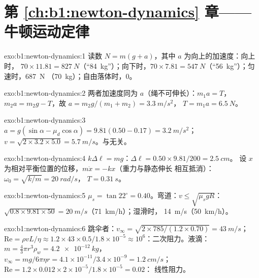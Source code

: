\section*{第 \ref{ch:b1:newton-dynamics} 章——牛顿运动定律}

\begin{solution}{exo:b1:newton-dynamics:1}
读数 $N = m(g + a)$，其中 $a$ 为向上的加速度：向上时，
$70 \times 11.81 = \qty{827}{N}$（``\qty{84}{kg}''）；向下时，$70 \times 7.81 =
\qty{547}{N}$（``\qty{56}{kg}''）；匀速时，\qty{687}{N}
（\qty{70}{kg}）；自由落体时，$0$。
\end{solution}

\begin{solution}{exo:b1:newton-dynamics:2}
两者加速度同为 $a$（绳不可伸长）：$m_1a = T$，
$m_2a = m_2g - T$，故 $a = m_2g/(m_1 + m_2) = \qty{3.3}{m/s^2}$，
$T = m_1a = \qty{6.5}{N}$。
\end{solution}

\begin{solution}{exo:b1:newton-dynamics:3}
$a = g(\sin\alpha - \mu_d\cos\alpha) = 9.81(0.50 - 0.17) = \qty{3.2}{m/s^2}$；
$v = \sqrt{2 \times 3.2 \times 5.0} = \qty{5.7}{m/s}$。与无关。
\end{solution}

\begin{solution}{exo:b1:newton-dynamics:4}
$k\Delta\ell = mg$：$\Delta\ell = 0.50 \times 9.81/200 = \qty{2.5}{cm}$。
设 $x$ 为相对平衡位置的位移，$m\ddot x = -kx$（重力与静态伸长
相互抵消）：$\omega_0 = \sqrt{k/m} = \qty{20}{rad/s}$，
$T = \qty{0.31}{s}$。
\end{solution}

\begin{solution}{exo:b1:newton-dynamics:5}
$\mu_s = \tan 22^\circ = 0.40$。弯道：$v \leq \sqrt{\mu_sgR}$：$\sqrt{0.8
\times 9.81 \times 50} = \qty{20}{m/s}$（\qty{71}{km/h}）；湿滑时，
\qty{14}{m/s}（\qty{50}{km/h}）。
\end{solution}

\begin{solution}{exo:b1:newton-dynamics:6}
跳伞者：$v_\infty = \sqrt{2 \times 785/(1.2 \times 0.70)} = \qty{43}{m/s}$；
$\mathrm{Re} = \rho vL/\eta \approx 1.2 \times 43 \times 0.5/1.8\times10^{-5}
\approx 10^6$：二次阻力。液滴：$m = \tfrac43\pi r^3\rho_w = \qty{4.2e-12}{kg}$，
$v_\infty = mg/6\pi\eta r = 4.1\times10^{-11}/3.4\times10^{-9} = \qty{1.2}{cm/s}$；
$\mathrm{Re} = 1.2 \times 0.012 \times 2\times10^{-5}/1.8\times10^{-5} = 0.02$：
线性阻力。
\end{solution}


